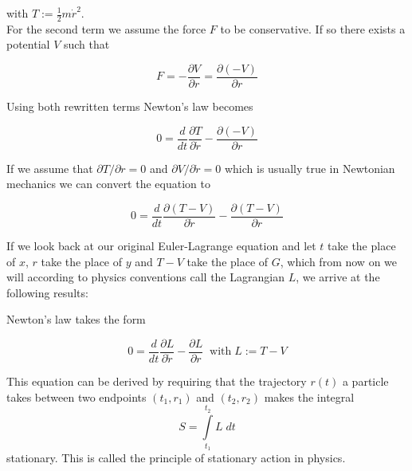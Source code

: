 \documentclass{article}
\begin{document}
with $T:=\frac{1}{2} m \dot{r}^2$. \\

For the second term we assume the force $F$ to be conservative. If so there exists a potential $V$ such that

\begin{equation}
F = - \frac{\partial V}{\partial r} = \frac{\partial (-V)}{\partial r}
\end{equation}

Using both rewritten terms Newton's law becomes


\begin{equation}
0 = \frac{d}{dt} \frac{\partial T}{\partial \dot{r}} - \frac{\partial (-V)}{\partial r}
\end{equation}



If we assume that $\partial T/ \partial r = 0$ and $\partial V / \partial \dot{r} = 0$ which is usually true in Newtonian mechanics we can convert the equation to 


\begin{equation}
0 = \frac{d}{dt} \frac{\partial (T-V)}{\partial \dot{r}} - \frac{\partial (T-V)}{\partial r}
\end{equation}

If we look back at our original Euler-Lagrange equation and let $t$ take the place of $x$, $r$ take the place of $y$ and $T-V$ take the place of $G$, which from now on we will according to physics conventions call the Lagrangian $L$, we arrive at the following results:

Newton's law takes the form

\begin{equation}
0 = \frac{d}{dt} \frac{\partial L}{\partial \dot{r}} - \frac{\partial L}{\partial r} \; \; \mbox{with} \; L := T-V
\end{equation}

This equation can be derived by requiring that the trajectory $r(t)$ a particle takes between two endpoints $(t_1,r_1)$ and $(t_2,r_2)$ makes the integral 
\begin{equation}
S=\int\limits_{t_1}^{t_2} L \; dt
\end{equation}
stationary. This is called the principle of stationary action in physics. \\
\end{document}
